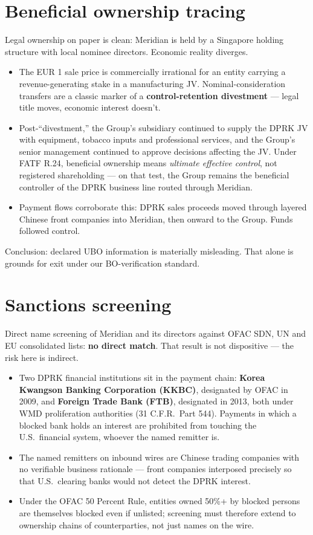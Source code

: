 \documentclass[10.5pt]{article}
\begin{document}
\section{Beneficial ownership tracing}
Legal ownership on paper is clean: Meridian is held by a Singapore holding structure with local nominee directors. Economic reality diverges.

\begin{itemize}
\item The EUR 1 sale price is commercially irrational for an entity carrying a revenue-generating stake in a manufacturing JV. Nominal-consideration transfers are a classic marker of a \textbf{control-retention divestment} --- legal title moves, economic interest doesn't.
\item Post-``divestment,'' the Group's subsidiary continued to supply the DPRK JV with equipment, tobacco inputs and professional services, and the Group's senior management continued to approve decisions affecting the JV. Under FATF R.24, beneficial ownership means \textit{ultimate effective control}, not registered shareholding --- on that test, the Group remains the beneficial controller of the DPRK business line routed through Meridian.
\item Payment flows corroborate this: DPRK sales proceeds moved through layered Chinese front companies into Meridian, then onward to the Group. Funds followed control.
\end{itemize}

Conclusion: declared UBO information is materially misleading. That alone is grounds for exit under our BO-verification standard.

\section{Sanctions screening}
Direct name screening of Meridian and its directors against OFAC SDN, UN and EU consolidated lists: \textbf{no direct match}. That result is not dispositive --- the risk here is indirect.

\begin{itemize}
\item Two DPRK financial institutions sit in the payment chain: \textbf{Korea Kwangson Banking Corporation (KKBC)}, designated by OFAC in 2009, and \textbf{Foreign Trade Bank (FTB)}, designated in 2013, both under WMD proliferation authorities (31 C.F.R.\ Part 544). Payments in which a blocked bank holds an interest are prohibited from touching the U.S.\ financial system, whoever the named remitter is.
\item The named remitters on inbound wires are Chinese trading companies with no verifiable business rationale --- front companies interposed precisely so that U.S.\ clearing banks would not detect the DPRK interest.
\item Under the OFAC 50 Percent Rule, entities owned 50\%+ by blocked persons are themselves blocked even if unlisted; screening must therefore extend to ownership chains of counterparties, not just names on the wire.
\end{itemize}
\end{document}
